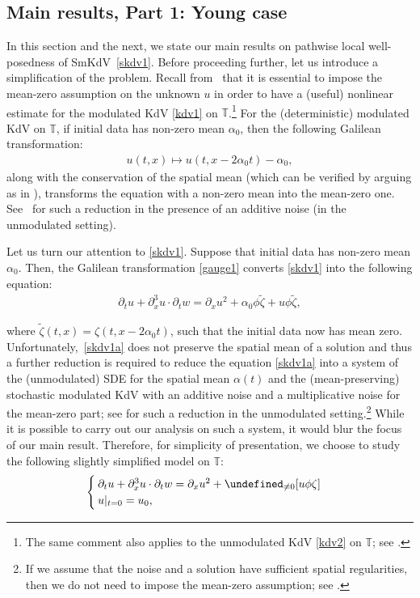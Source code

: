 \documentclass[letterpaper, 11pt,  reqno]{amsart}
\newcommand{\1}{\hspace{0.5mm}\textup{I}\hspace{0.5mm}}
\newcommand{\noi}{\noindent}
\newcommand{\T}{\mathbb{T}}
\let\P= \undefined
\newcommand{\P}{\mathbf{P}}
\newcommand{\al}{\alpha}
\newcommand{\wt}{\widetilde}
\newcommand{\dx}{\partial_x}
\newcommand{\dt}{\partial_t}
\newcommand{\z}{\zeta}
\numberwithin{equation}{section}
\numberwithin{theorem}{section}
\begin{document}
\subsection{Main results, Part 1: Young case} 
\label{SUBSEC:main1}


In this section and the next, 
we state our main results on 
pathwise local well-posedness
of SmKdV~\eqref{skdv1}.
Before proceeding further, let us introduce a simplification 
of the problem.
Recall from~\cite{CGLLO1}
that it is essential to impose 
the mean-zero assumption
on the unknown $u$
in order to have a (useful) nonlinear estimate
for the modulated KdV \eqref{kdv1} on $\T$.\footnote{The same comment also applies
to the unmodulated KdV \eqref{kdv2} on $\T$; see \cite{BO93, KPV96, CKSTT03}.}
For the (deterministic) modulated KdV on $\T$, 
if initial data has non-zero mean $\al_0$, then the following Galilean transformation:
\begin{align}
u(t, x)\mapsto u (t, x - 2\al_0t)-\al_0,
\label{gauge1} 
\end{align}
along with the conservation of the spatial mean (which can be verified
by arguing as in \cite[Section 6]{CGLLO1}), 
transforms
the equation with a non-zero mean into the mean-zero one.
See~\cite{Oh2} for such a reduction 
in the presence of an additive noise (in the unmodulated setting).

Let us turn our attention to \eqref{skdv1}.
Suppose that
initial data has non-zero mean $\al_0$.
Then, the Galilean transformation \eqref{gauge1}
converts \eqref{skdv1} into the following equation:
\begin{align}
\dt u+  \dx^3 u \cdot \dt w = \dx u^2 + 
\al_0  \phi \wt \zeta
+ u \phi \wt \zeta, 
\label{skdv1a}
\end{align}

\noi
where $\wt \z(t, x) = \z(t, x - 2\al_0 t)$,
such that the initial data now has mean zero.
Unfortunately,~\eqref{skdv1a} does not preserve the spatial mean of a solution and thus 
a further reduction is required to 
reduce the equation \eqref{skdv1a}
into a system of the (unmodulated) SDE for the spatial mean $\al(t)$
and the (mean-preserving) stochastic modulated KdV with an additive noise
and a multiplicative noise for the mean-zero part;
see \cite{CCO} for such a reduction in the unmodulated setting.\footnote{If we assume that 
the noise and a solution have sufficient spatial regularities, 
then we do not need to impose the mean-zero assumption; see \cite{Tsutsumi}.}
While it is possible to carry out our analysis on such a system, 
it would blur the focus of our main result.
Therefore, 
for simplicity of presentation, 
we choose to study the following slightly simplified model on $\T$:
\begin{align}
\begin{cases}
\dt u+  \dx^3 u \cdot \dt w = \dx u^2 + \P_{\ne 0}[u \phi \zeta]\\
u|_{t = 0} = u_0,
\end{cases}
\label{skdv2}
\end{align}
\end{document}
